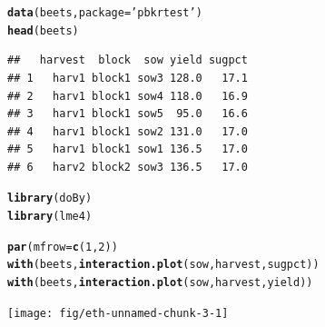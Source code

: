 \documentclass[compress]{beamer}\usepackage[]{graphicx}\usepackage[]{color}
\makeatletter
\newcommand{\hlnum}[1]{\textcolor[rgb]{0.686,0.059,0.569}{#1}}%
\newcommand{\hlstr}[1]{\textcolor[rgb]{0.192,0.494,0.8}{#1}}%
\newcommand{\hlstd}[1]{\textcolor[rgb]{0.345,0.345,0.345}{#1}}%
\newcommand{\hlkwc}[1]{\textcolor[rgb]{0.333,0.667,0.333}{#1}}%
\newcommand{\hlkwd}[1]{\textcolor[rgb]{0.737,0.353,0.396}{\textbf{#1}}}%
\newenvironment{kframe}{%
 \def\at@end@of@kframe{}%
 \ifinner\ifhmode%
  \def\at@end@of@kframe{\end{minipage}}%
  \begin{minipage}{\columnwidth}%
 \fi\fi%
 \def\FrameCommand##1{\hskip\@totalleftmargin \hskip-\fboxsep
 \colorbox{shadecolor}{##1}\hskip-\fboxsep
     \hskip-\linewidth \hskip-\@totalleftmargin \hskip\columnwidth}%
 \MakeFramed {\advance\hsize-\width
   \@totalleftmargin\z@ \linewidth\hsize
   \@setminipage}}%
 {\par\unskip\endMakeFramed%
 \at@end@of@kframe}
\newenvironment{knitrout}{}{} %
\newenvironment{sframe}
{\begin{frame} [containsverbatim] }
  {\end{frame}}
\makeatother
\begin{document}
\begin{sframe}
\begin{knitrout}\tiny
{}\color{fgcolor}\begin{kframe}
\begin{alltt}
\hlkwd{data}\hlstd{(beets,} \hlkwc{package}\hlstd{=}\hlstr{'pbkrtest'}\hlstd{)}
\hlkwd{head}\hlstd{(beets)}
\end{alltt}
\begin{verbatim}
##   harvest  block  sow yield sugpct
## 1   harv1 block1 sow3 128.0   17.1
## 2   harv1 block1 sow4 118.0   16.9
## 3   harv1 block1 sow5  95.0   16.6
## 4   harv1 block1 sow2 131.0   17.0
## 5   harv1 block1 sow1 136.5   17.0
## 6   harv2 block2 sow3 136.5   17.0
\end{verbatim}
\begin{alltt}
\hlkwd{library}\hlstd{(doBy)}
\hlkwd{library}\hlstd{(lme4)}
\end{alltt}
\end{kframe}
\end{knitrout}
\end{sframe}

\begin{sframe}

\begin{knitrout}\tiny
{}\color{fgcolor}\begin{kframe}
\begin{alltt}
\hlkwd{par}\hlstd{(}\hlkwc{mfrow}\hlstd{=}\hlkwd{c}\hlstd{(}\hlnum{1}\hlstd{,}\hlnum{2}\hlstd{))}
\hlkwd{with}\hlstd{(beets,} \hlkwd{interaction.plot}\hlstd{(sow, harvest, sugpct))}
\hlkwd{with}\hlstd{(beets,} \hlkwd{interaction.plot}\hlstd{(sow, harvest, yield))}
\end{alltt}
\end{kframe}
\texttt{[image: fig/eth-unnamed-chunk-3-1]} 

\end{knitrout}
\end{sframe}
\end{document}
